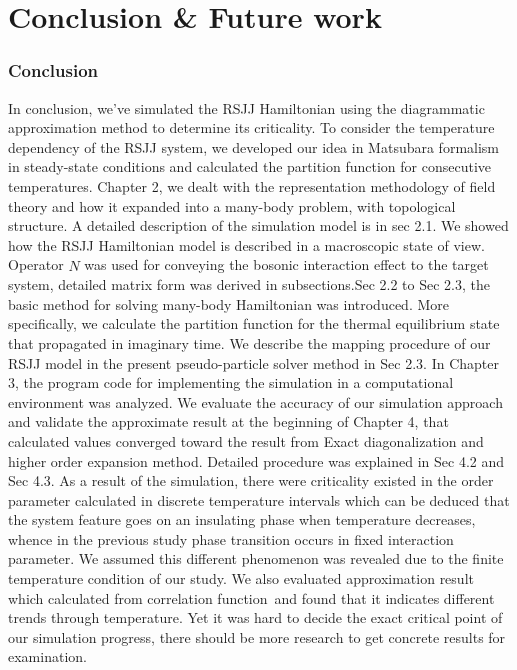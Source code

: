 \documentclass{article}[12pt]
\numberwithin{equation}{section}
\begin{document}
\section{Conclusion \& Future work}
\begin{spacing}{1.5}
    \subsubsection*{Conclusion}
In conclusion, we’ve simulated the RSJJ Hamiltonian using the diagrammatic approximation method to determine its criticality. 
To consider the temperature dependency of the RSJJ system, we developed our idea in Matsubara formalism in steady-state conditions 
and calculated the partition function for consecutive temperatures. Chapter 2, we dealt with the representation methodology of field theory 
and how it expanded into a many-body problem, with topological structure. A detailed description of the simulation model is in sec 2.1. We showed how the RSJJ Hamiltonian model 
is described in a macroscopic state of view. Operator $\hat{N}$ was used for conveying the bosonic interaction effect to the target system, 
detailed matrix form was derived in subsections.Sec 2.2 to Sec 2.3, 
the basic method for solving many-body Hamiltonian was introduced. More specifically, 
we calculate the partition function for the thermal equilibrium state that propagated in imaginary time. 
We describe the mapping procedure of our RSJJ model in the present pseudo-particle solver method in Sec 2.3.  
 In Chapter 3, the program code for implementing the simulation in a computational environment 
was analyzed. We evaluate the accuracy of our simulation approach and validate the approximate result at the beginning of Chapter 4, 
that calculated values converged toward the result from Exact diagonalization and higher order expansion method. 
Detailed procedure was explained in Sec 4.2 and Sec 4.3. As a result of the simulation, 
there were criticality existed in the order parameter calculated in discrete temperature intervals 
which can be deduced that the system feature goes on an insulating phase when temperature decreases, 
whence in the previous study phase transition occurs in fixed interaction parameter. 
We assumed this different phenomenon was revealed due to the finite temperature condition of our study. 
We also evaluated approximation result which calculated from correlation function and found that it indicates different trends through temperature.
Yet it was hard to decide the exact critical point of our simulation progress, there should be more research to get concrete results for examination. 

\end{spacing}
\end{document}
